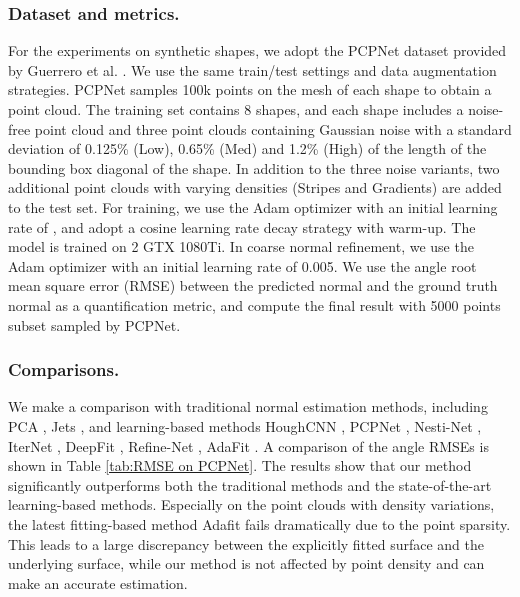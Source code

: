 \documentclass[letterpaper]{article} \usepackage{aaai23}  \usepackage{times}  \usepackage{helvet}  \usepackage{courier}  \usepackage[hyphens]{url}  \usepackage{graphicx} \urlstyle{rm} \def\UrlFont{\rm}  \usepackage{natbib}  \usepackage{caption} \frenchspacing  \setlength{\pdfpagewidth}{8.5in} \setlength{\pdfpageheight}{11in} \usepackage{algorithm}
\begin{document}
\subsubsection{Dataset and metrics.}
For the experiments on synthetic shapes, we adopt the PCPNet dataset provided by Guerrero et al. . We use the same train/test settings and data augmentation strategies. PCPNet samples 100k points on the mesh of each shape to obtain a point cloud. The training set contains 8 shapes, and each shape includes a noise-free point cloud and three point clouds containing Gaussian noise with a standard deviation of 0.125\% (Low), 0.65\% (Med) and 1.2\% (High) of the length of the bounding box diagonal of the shape. In addition to the three noise variants, two additional point clouds with varying densities (Stripes and Gradients) are added to the test set. For training, we use the Adam optimizer with an initial learning rate of , and adopt a cosine learning rate decay strategy with warm-up. The model is trained on 2 GTX 1080Ti. In coarse normal refinement, we use the Adam optimizer with an initial learning rate of 0.005. We use the angle root mean square error (RMSE) between the predicted normal and the ground truth normal as a quantification metric, and compute the final result with 5000 points subset sampled by PCPNet.

\subsubsection{Comparisons.}
We make a comparison with traditional normal estimation methods, including PCA \cite{HoppeHugues1992SurfaceRF}, Jets  \cite{FrdricCazals2003EstimatingDQ}, and learning-based methods HoughCNN \cite{AlexandreBoulch2016DeepLF}, PCPNet  \cite{PaulGuerrero2017PCPNETLL}, Nesti-Net \cite{YizhakBenShabat2018NestiNetNE}, IterNet \cite{JanEricLenssen2019DeepIS}, DeepFit \cite{ben2020deepfit}, Refine-Net \cite{9693131}, AdaFit \cite{RunsongZhu2021AdaFitRL}. A comparison of the angle RMSEs is shown in Table \ref{tab:RMSE on PCPNet}. The results show that our method significantly outperforms both the traditional methods and the state-of-the-art learning-based methods. Especially on the point clouds with density variations, the latest fitting-based method Adafit fails dramatically due to the point sparsity. This leads to a large discrepancy between the explicitly fitted surface and the underlying surface, while our method is not affected by point density and can make an accurate estimation.
\end{document}
